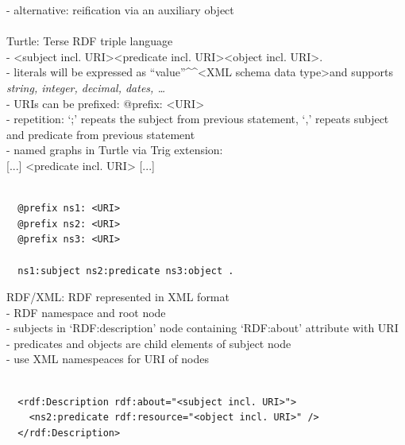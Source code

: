 - alternative: reification via an auxiliary object \\
\\
Turtle: Terse RDF triple language \\
- \textless subject incl. URI\textgreater \textless predicate incl. URI\textgreater \textless object incl. URI\textgreater . \\
- literals will be expressed as ``value''\^{}\^{}\textless XML schema data type\textgreater and supports \textit{string, integer, decimal, dates, \ldots} \\
- URIs can be prefixed: @prefix: \textless URI\textgreater \\
- repetition: `;' repeats the subject from previous statement, `,' repeats subject and predicate from previous statement \\
- named graphs in Turtle via Trig extension: \\
  { [...] } \textless predicate incl. URI\textgreater { [...] } \\
\\
\begin{verbatim}
  @prefix ns1: <URI>
  @prefix ns2: <URI>
  @prefix ns3: <URI>

  ns1:subject ns2:predicate ns3:object .
\end{verbatim}

RDF/XML: RDF represented in XML format \\
- RDF namespace and root node \\
- subjects in `RDF:description' node containing `RDF:about' attribute with URI \\
- predicates and objects are child elements of subject node \\
- use XML namespeaces for URI of nodes \\
\\
\begin{verbatim}
  <rdf:Description rdf:about="<subject incl. URI>">
    <ns2:predicate rdf:resource="<object incl. URI>" />
  </rdf:Description>
\end{verbatim}

